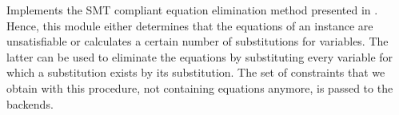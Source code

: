 Implements the SMT compliant equation elimination method presented in \cite{griggio2012practical}.
Hence, this module either determines that the equations of an instance are unsatisfiable
or calculates a certain number of substitutions for variables. The latter can be used to 
eliminate the equations by substituting every variable for which a substitution exists
by its substitution. The set of constraints that we obtain with this procedure, not containing equations 
anymore, is passed to the backends.